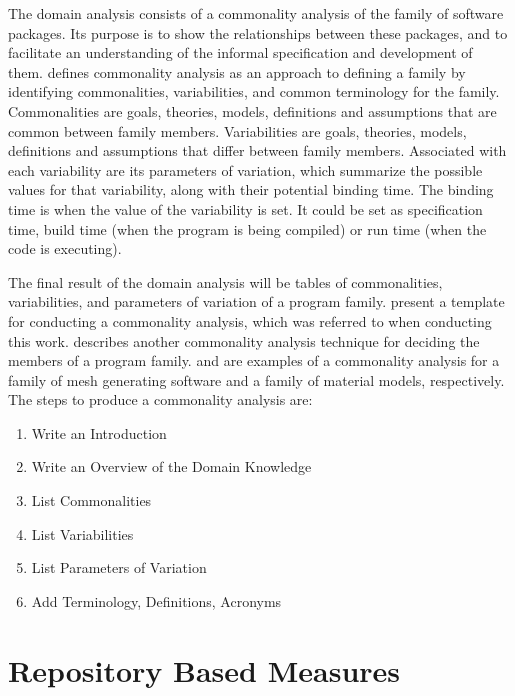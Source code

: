\documentclass[letterpaper,cleveref]{lipics-v2019}
\begin{document}
The domain analysis consists of a commonality analysis of the family of software
packages. Its purpose is to show the relationships between these packages, and
to facilitate an understanding of the informal specification and development of
them. \cite{weiss1997defining} defines commonality analysis as an approach to
defining a family by identifying commonalities, variabilities, and common
terminology for the family. Commonalities are goals, theories, models,
definitions and assumptions that are common between family members.
Variabilities are goals, theories, models, definitions and assumptions that
differ between family members. Associated with each variability are its
parameters of variation, which summarize the possible values for that
variability, along with their potential binding time.  The binding time is when
the value of the variability is set.  It could be set as specification time,
build time (when the program is being compiled) or run time (when the code is
executing).

The final result of the domain analysis will be tables of commonalities,
variabilities, and parameters of variation of a program family.
\cite{smith2008commonality} present a template for conducting a commonality
analysis, which was referred to when conducting this work.
\cite{weiss1998commonality} describes another commonality analysis technique for
deciding the members of a program family. \cite{SmithAndChen2004} and
\cite{SmithMcCutchanAndCarette2017} are examples of a commonality analysis for a
family of mesh generating software and a family of material models,
respectively. The steps to produce a commonality analysis are:

\begin{enumerate}
\item Write an Introduction
\item Write an Overview of the Domain Knowledge
\item List Commonalities
\item List Variabilities
\item List Parameters of Variation
\item Add Terminology, Definitions, Acronyms
\end{enumerate}


\section{Repository Based Measures} \label{SecEmpiricalMeasures}
\end{document}
